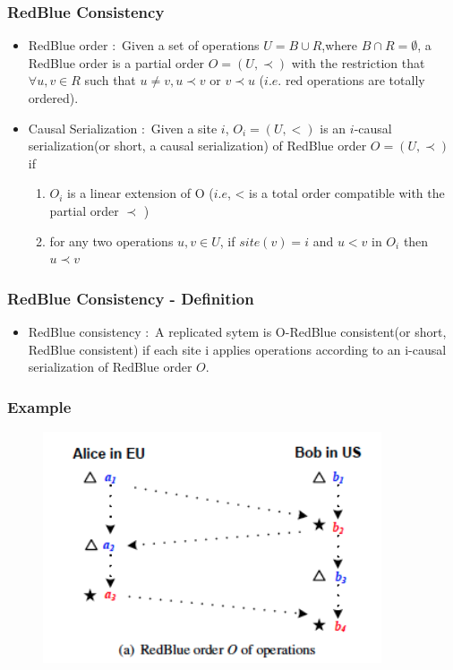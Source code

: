 \documentclass{beamer}
\begin{document}
\begin{frame}
\frametitle{RedBlue Consistency}
\begin{itemize}
\item RedBlue order $\colon$ Given a set of operations $U = B \cup R$,where $B \cap R = \emptyset$, a RedBlue order is a partial order $O = ( U, \prec)$ with the restriction that $\forall u,v \in R$ such that $u \neq v, u \prec v $ or $v \prec u$ ($i.e.$ red operations are totally ordered).

\item Causal Serialization $\colon$ Given a site $i$, $O_i = (U, <)$ is an $i$-causal serialization(or short, a causal serialization) of RedBlue order $O = ( U, \prec)$ if 
 \begin{enumerate}
\item$O_i$ is a linear extension of O ($i.e$, < is a total order compatible with the partial order $\prec$ ) 
\item for any two operations $u,v \in U$, if $site(v) = i$ and $u < v$ in $O_i$ then $u \prec v$
\end{enumerate} 
\end{itemize}

\end{frame}



\begin{frame}
\frametitle{RedBlue Consistency - Definition}
\begin{itemize}
\item RedBlue consistency $\colon$ A replicated sytem is O-RedBlue consistent(or short, RedBlue consistent) if each site i applies operations according to an i-causal serialization of RedBlue order $O$.
\end{itemize}
\end{frame}


\begin{frame}
\frametitle{Example}
\begin{figure}[t]
\includegraphics[width=10cm]{pic2.jpg}
\centering
\end{figure}
\end{frame}
\end{document}
